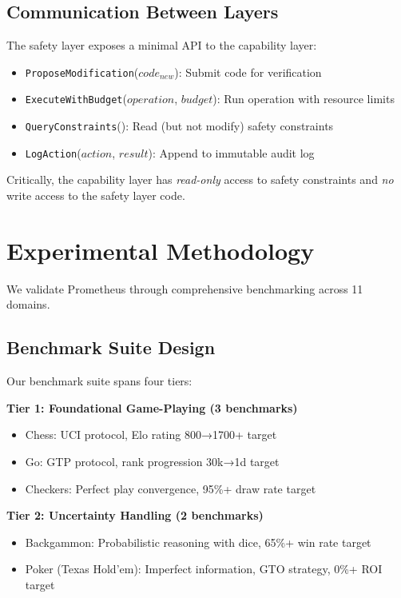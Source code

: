 \documentclass[11pt,letterpaper]{article}
\begin{document}
\subsection{Communication Between Layers}

The safety layer exposes a minimal API to the capability layer:

\begin{itemize}
\item \texttt{ProposeModification}($code_{new}$): Submit code for verification
\item \texttt{ExecuteWithBudget}($operation$, $budget$): Run operation with resource limits
\item \texttt{QueryConstraints}(): Read (but not modify) safety constraints
\item \texttt{LogAction}($action$, $result$): Append to immutable audit log
\end{itemize}

Critically, the capability layer has \textit{read-only} access to safety constraints and \textit{no} write access to the safety layer code.

\section{Experimental Methodology}

We validate Prometheus through comprehensive benchmarking across 11 domains.

\subsection{Benchmark Suite Design}

Our benchmark suite spans four tiers:

\textbf{Tier 1: Foundational Game-Playing (3 benchmarks)}
\begin{itemize}
\item Chess: UCI protocol, Elo rating 800→1700+ target
\item Go: GTP protocol, rank progression 30k→1d target
\item Checkers: Perfect play convergence, 95\%+ draw rate target
\end{itemize}

\textbf{Tier 2: Uncertainty Handling (2 benchmarks)}
\begin{itemize}
\item Backgammon: Probabilistic reasoning with dice, 65\%+ win rate target
\item Poker (Texas Hold'em): Imperfect information, GTO strategy, 0\%+ ROI target
\end{itemize}
\end{document}
